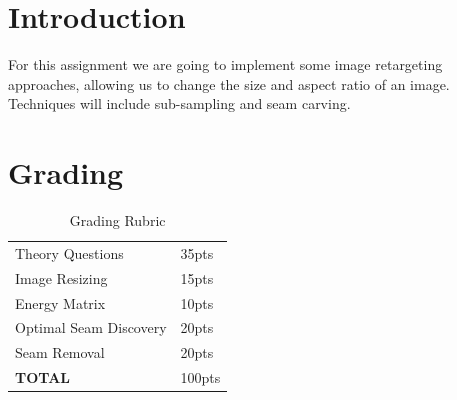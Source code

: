 \documentclass[12pt]{article}
\begin{document}
\maketitle


\section*{Introduction}
For this assignment we are going to implement some image retargeting approaches, allowing us to change the size and aspect ratio of an image.   Techniques will include sub-sampling and seam carving. 



\section*{Grading}
\begin{table}[h]
\begin{centering}
\begin{tabular}{|l|l|}
\hline
Theory Questions & 35pts \\
Image Resizing & 15pts\\
Energy Matrix & 10pts \\
Optimal Seam Discovery & 20pts\\
Seam Removal & 20pts\\
\hline
\textbf{TOTAL} & 100pts\\
\hline
\end{tabular}
\caption{Grading Rubric}
\end{centering}
\end{table}

\newpage
\end{document}
